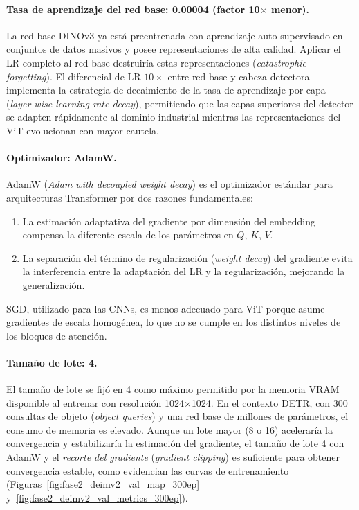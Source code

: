 \paragraph{Tasa de aprendizaje del red base: 0.00004 (factor 10$\times$ menor).}
La red base DINOv3 ya está preentrenada con aprendizaje auto-supervisado en conjuntos de datos masivos y posee representaciones de alta calidad. Aplicar el LR completo al red base destruiría estas representaciones (\textit{catastrophic forgetting}). El diferencial de LR $10\times$ entre red base y cabeza detectora implementa la estrategia de decaimiento de la tasa de aprendizaje por capa (\textit{layer-wise learning rate decay}), permitiendo que las capas superiores del detector se adapten rápidamente al dominio industrial mientras las representaciones del ViT evolucionan con mayor cautela.

\paragraph{Optimizador: AdamW.}
AdamW (\textit{Adam with decoupled weight decay}) es el optimizador estándar para arquitecturas Transformer por dos razones fundamentales:
\begin{enumerate}
    \item La estimación adaptativa del gradiente por dimensión del embedding compensa la diferente escala de los parámetros en $Q$, $K$, $V$.
    \item La separación del término de regularización (\textit{weight decay}) del gradiente evita la interferencia entre la adaptación del LR y la regularización, mejorando la generalización.
\end{enumerate}
SGD, utilizado para las CNNs, es menos adecuado para ViT porque asume gradientes de escala homogénea, lo que no se cumple en los distintos niveles de los bloques de atención.

\paragraph{Tamaño de lote: 4.}
El tamaño de lote se fijó en 4 como máximo permitido por la memoria \acrshort{VRAM} disponible al entrenar con resolución 1024$\times$1024. En el contexto DETR, con 300 consultas de objeto (\textit{object queries}) y una red base de millones de parámetros, el consumo de memoria es elevado. Aunque un lote mayor (8 o 16) aceleraría la convergencia y estabilizaría la estimación del gradiente, el tamaño de lote 4 con AdamW y el \textit{recorte del gradiente} (\textit{gradient clipping}) es suficiente para obtener convergencia estable, como evidencian las curvas de entrenamiento (Figuras~\ref{fig:fase2_deimv2_val_map_300ep} y~\ref{fig:fase2_deimv2_val_metrics_300ep}).

